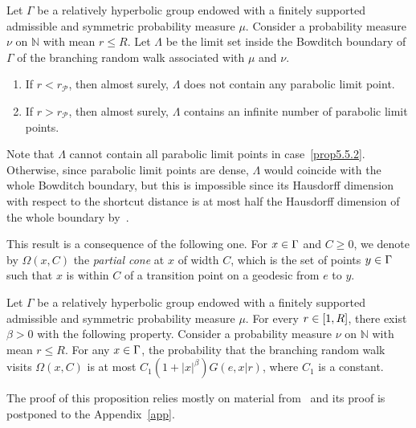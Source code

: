 \documentclass[AHL,Unicode,longabstracts]{cedram}
\newcommand\bbN{\mathbb{N}}
\newcommand{\clP}{\mathcal{P}}
\let\oldin\in
\renewcommand{\in}{\mathchoice{\oldin}{\oldin}{\,\oldin\,}{\,\oldin\,}}
\begin{document}
\begin{prop}\label{propparaboliclimitset}
Let $\Gamma$ be a relatively hyperbolic group endowed with a finitely supported admissible and symmetric probability measure $\mu$. Consider a probability measure $\nu$ on $\bbN$ with mean $r\leq R$. Let $\Lambda$ be the limit set inside the Bowditch boundary of $\Gamma$ of the branching random walk associated with $\mu$ and $\nu$.
\begin{enumerate}
\item\label{prop5.5.1} If $r<r_\clP$, then almost surely, $\Lambda$ does not contain any parabolic limit point.
\item\label{prop5.5.2} If $r>r_\clP$, then almost surely, $\Lambda$ contains an infinite number of parabolic limit points.
\end{enumerate}
\end{prop}

Note that $\Lambda$ cannot contain all parabolic limit points in case~\eqref{prop5.5.2}. Otherwise, since parabolic limit points are dense, $\Lambda$ would coincide with the whole Bowditch boundary, but this is impossible since its Hausdorff dimension with respect to the shortcut distance is at most half the Hausdorff dimension of the whole boundary by~\cite[Theorem~1.1, Theorem~1.2]{DWY}.

This result is a consequence of the following one. For $x\in \Gamma$ and $C\geq0$, we denote by $\Omega(x,C)$ the \emph{partial cone} at $x$ of width $C$, which is the set of points $y\in \Gamma$ such that $x$ is within $C$ of a transition point on a geodesic from $e$ to $y$.

\begin{prop}\label{proppartialcone}
Let $\Gamma$ be a relatively hyperbolic group endowed with a finitely supported admissible and symmetric probability measure $\mu$. For every $r\in [1,R]$, there exist $\beta>0$ with the following property. Consider a probability measure $\nu$ on $\bbN$ with mean $r\leq R$. For any $x\in \Gamma$, the probability that the branching random walk visits $\Omega(x,C)$ is at most $C_1(1+|x|^\beta)G(e,x|r)$, where $C_1$ is a constant.
\end{prop}

The proof of this proposition relies mostly on material from~\cite{DWY} and its proof is postponed to the Appendix~\ref{app}.
\end{document}
